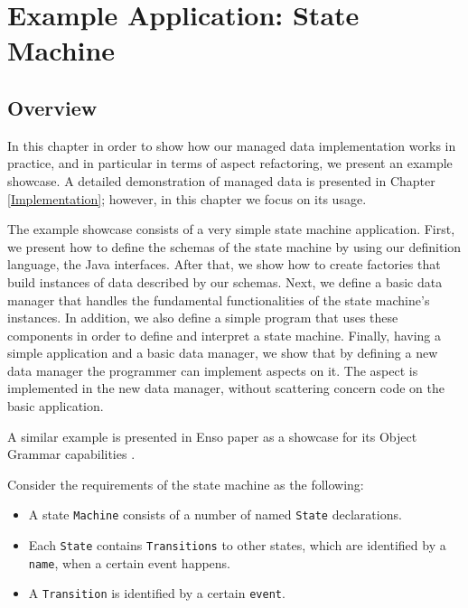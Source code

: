 
\chapter{Example Application: State Machine}\label{Example Application}

\section{Overview}
In this chapter in order to show how our managed data implementation works in practice, and in particular in terms of aspect refactoring, we present an example showcase.
A detailed demonstration of managed data is presented in Chapter \ref{Implementation}; however, in this chapter we focus on its usage.

The example showcase consists of a very simple state machine application.
First, we present how to define the schemas of the state machine by using our definition language, the Java interfaces.
After that, we show how to create factories that build instances of data described by our schemas.
Next, we define a basic data manager that handles the fundamental functionalities of the state machine's instances.
In addition, we also define a simple program that uses these components in order to define and interpret a state machine.
Finally, having a simple application and a basic data manager, we show that by defining a new data manager the programmer can implement aspects on it.
The aspect is implemented in the new data manager, without scattering concern code on the basic application.

A similar example is presented in Enso paper as a showcase for its Object Grammar capabilities \cite{storm2012object}.

Consider the requirements of the state machine as the following: 
\begin{itemize}
	\item A state \texttt{Machine} consists of a number of named \texttt{State} declarations.

	\item Each \texttt{State} contains \texttt{Transitions} to other states, which are identified by a \texttt{name}, when a certain event happens.

	\item A \texttt{Transition} is identified by a certain \texttt{event}.
\end{itemize}

